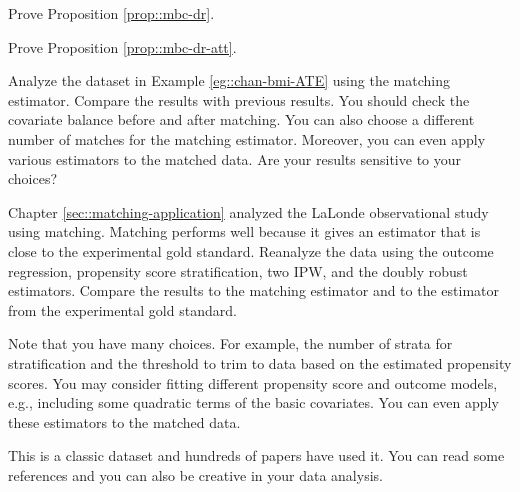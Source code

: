 \begin{HomeworkProblem}\label{exr:15-2}

Prove Proposition \ref{prop::mbc-dr}.


\end{HomeworkProblem}

\begin{HomeworkProblem}\label{exr:15-3}

Prove Proposition \ref{prop::mbc-dr-att}.


\end{HomeworkProblem}

\begin{HomeworkProblem}\label{exr:15-4}


Analyze the dataset in Example \ref{eg::chan-bmi-ATE} using the matching estimator. Compare the results with previous results.
You should check the covariate balance before and after matching. You can also choose a different number of matches for the matching estimator.  Moreover, you can even apply various estimators to the matched data.
Are your results sensitive to your choices?




\end{HomeworkProblem}

\begin{HomeworkProblem}\label{exr:15-5}


Chapter \ref{sec::matching-application} analyzed the LaLonde observational study using matching. Matching performs well because it gives an estimator that is close to the experimental gold standard. Reanalyze the data using the outcome regression, propensity score stratification, two IPW, and the doubly robust estimators. Compare the results to the matching estimator and to the estimator from the experimental gold standard.

Note that you have many choices. For example, the number of strata for stratification and the threshold to trim to data based on the estimated propensity scores. You may consider fitting different propensity score and outcome models, e.g., including some quadratic terms of the basic covariates. You can even apply these estimators to the matched data.

This is a classic dataset and hundreds of papers have used it. You can read some references \citep{dehejia1999causal, hainmueller2012entropy} and you can also be creative in your data analysis.



\end{HomeworkProblem}

